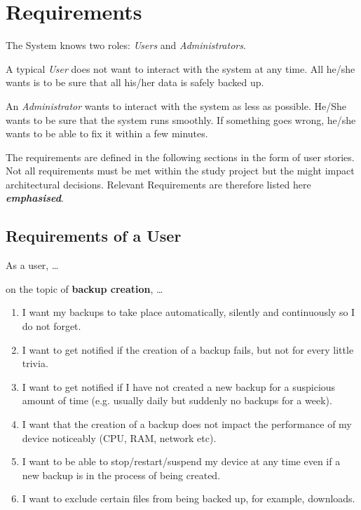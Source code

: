 \newcommand{\relevantreq}[1]{\textit{\textbf{#1}}}
\newcommand{\enumcountsave}{\setcounter{listcounter}{\value{enumi}}}
\newcommand{\enumcountrestore}{\setcounter{enumi}{\value{listcounter}}}

\section{Requirements}
\label{requirements}
The System knows two roles: \emph{Users} and \emph{Administrators}.

A typical \emph{User} does not want to interact with the system at any time.
All he/she wants is to be sure that all his/her data is safely backed
up.

An \emph{Administrator} wants to interact with the system as less as possible.
He/She wants to be sure that the system runs smoothly. If something goes
wrong, he/she wants to be able to fix it within a few minutes.


The requirements are defined in the following sections in the form of user stories.
Not all requirements must be met within the study project but the might %
impact architectural decisions. Relevant Requirements are therefore listed here \relevantreq{emphasised}.

\subsection{Requirements of a User}
As a user, \ldots{}

\begin{flushright}
on the topic of \textbf{backup creation}, \ldots{}
\end{flushright}

\begin{enumerate}
	\item	I want my backups to take place automatically, silently and continuously so I do not forget.
	\item	I want to get notified if the creation of a backup fails, but not for every little trivia.
	\item	I want to get notified if I have not created a new backup for a suspicious amount of time (e.g. usually daily but suddenly no backups for a week).
	\item	I want that the creation of a backup does not impact the performance of my device noticeably (CPU, RAM, network etc).
	\item	I want to be able to stop/restart/suspend my device at any time even if a new backup is in the process of being created.
	\item	I want to exclude certain files from being backed up, for example, downloads.
	\enumcountsave
\end{enumerate}

